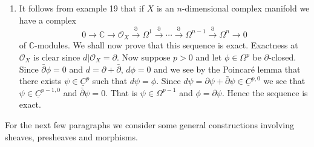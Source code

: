 \begin{enumerate}[start=20]
\[
\begin{gathered}
0\to\Omega^p\xrightarrow{i}\underline C^{p,0}\xrightarrow{\bar\partial}\underline C^{p,1}\xrightarrow{\bar\partial}\cdots\xrightarrow{\bar\partial}\underline C^{p,n-1}\xrightarrow{\bar\partial}\underline C^{p,n}\to0,\\
0\to\overline\Omega^q\xrightarrow{i}\underline C^{0,q}\xrightarrow{\partial}\underline C^{1,q}\xrightarrow{\partial}\cdots\xrightarrow{\partial}\underline C^{n-1,q}\xrightarrow{\partial}\underline C^{n,q}\to0.
\end{gathered}
\]
Here $i$ denotes inclusion and $\overline\Omega^q$ denotes the sheaf of germs of anti-holomorphic sections of the anti-holomorphic bundle $\bigwedge^{0,q}(X)'$. In case $p=0$, we obtain the important complex
\[
0\to\mathcal O_X\to\mathcal D_X\xrightarrow{\bar\partial}\underline C^{0,1}\xrightarrow{\bar\partial}\cdots\xrightarrow{\bar\partial}\underline C^{0,n-1}\xrightarrow{\bar\partial}\underline C^{0,n}\to0
\]
which relates the Oka sheaf to the sheaves $\underline C^{0,q}$.
It is an immediate consequence of the Dolbeault--Grothendieck lemma (Theorem~\ref{theorem:5.8.1}) that the Dolbeault complexes are all exact.
\item It follows from example 19 that if $X$ is an $n$-dimensional complex manifold we have a complex
\[
0\to\mathbb C\to\mathcal O_X\xrightarrow{\partial}\Omega^1\xrightarrow{\partial}\cdots\xrightarrow{\partial}\Omega^{n-1}\xrightarrow{\partial}\Omega^n\to0
\]
of $\mathbb C$-modules. We shall now prove that this sequence is exact.
Exactness at $\mathcal O_X$ is clear since $d|\mathcal O_X=\partial$. Now suppose $p>0$ and let $\phi\in\Omega^p$ be $\partial$-closed. Since $\bar\partial\phi=0$ and $d=\partial+\bar\partial$, $d\phi=0$ and we see by the Poincar\'e lemma that there exists $\psi\in\underline C^p$ such that $d\psi=\phi$. Since $d\psi=\partial\psi+\bar\partial\psi\in\underline C^{p,0}$ we see that $\psi\in\underline C^{p-1,0}$ and $\bar\partial\psi=0$. That is $\psi\in\Omega^{p-1}$ and $\phi=\partial\psi$. Hence the sequence is exact.
\end{enumerate}
For the next few paragraphs we consider some general constructions involving sheaves, presheaves and morphisms.

